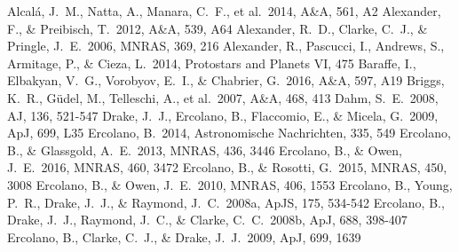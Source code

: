 \documentclass[10pt,fleqn,twoside,a4paper]{article}
\newcommand*\aap{A\&A}
\newcommand*\aj{AJ}
\newcommand*\apj{ApJ}
\newcommand*\apjl{ApJ}
\newcommand*\apjs{ApJS}
\newcommand*\mnras{MNRAS}
\begin{document}
\begingroup
\renewcommand{\section}[2]{}%
\begin{thebibliography}{}
 Alcal{\'a}, J.~M., Natta, A., Manara, C.~F., et al.\ 2014, \aap, 561, A2 
 Alexander, F., \& Preibisch, T.\ 2012, \aap, 539, A64
 Alexander, R.~D., Clarke, C.~J., \& Pringle, J.~E.\ 2006, \mnras, 369, 216 
 Alexander, R., Pascucci, I., Andrews, S., Armitage, P., \& Cieza, L.\ 2014, Protostars and Planets VI, 475
 Baraffe, I., Elbakyan, V.~G., Vorobyov, E.~I., \& Chabrier, G.\ 2016, \aap, 597, A19
 Briggs, K.~R., G{\"u}del, M., Telleschi, A., et al.\ 2007, \aap, 468, 413 
 Dahm, S.~E.\ 2008, \aj, 136, 521-547 
 Drake, J.~J., Ercolano, B., Flaccomio, E., \& Micela, G.\ 2009, \apjl, 699, L35
 Ercolano, B.\ 2014, Astronomische Nachrichten, 335, 549
 Ercolano, B., \& Glassgold, A.~E.\ 2013, \mnras, 436, 3446 
 Ercolano, B., \& Owen, J.~E.\ 2016, \mnras, 460, 3472 
 Ercolano, B., \& Rosotti, G.\ 2015, \mnras, 450, 3008 
 Ercolano, B., \& Owen, J.~E.\ 2010, \mnras, 406, 1553
 Ercolano, B., Young, P.~R., Drake, J.~J., \& Raymond, J.~C.\ 2008a, \apjs, 175, 534-542 
 Ercolano, B., Drake, J.~J., Raymond, J.~C., \& Clarke, C.~C.\ 2008b, \apj, 688, 398-407 
 Ercolano, B., Clarke, C.~J., \& Drake, J.~J.\ 2009, \apj, 699, 1639

\end{thebibliography}
\end{document}
